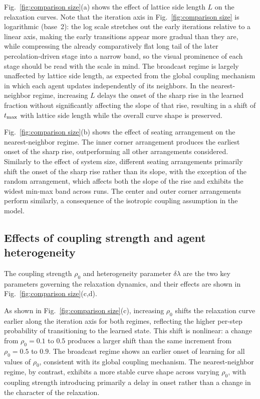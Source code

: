 \documentclass[a4paper,fleqn]{cas-sc}
\begin{document}
  Fig.~\ref{fig:comparison size}(a) shows the effect of lattice side length $L$ on the relaxation curves.
  Note that the iteration axis in Fig.~\ref{fig:comparison size} is logarithmic (base~2): the log scale stretches out the early iterations relative to a linear axis, making the early transitions appear more gradual than they are, while compressing the already comparatively flat long tail of the later percolation-driven stage into a narrow band, so the visual prominence of each stage should be read with the scale in mind.
  The broadcast regime is largely unaffected by lattice side length, as expected from the global coupling mechanism in which each agent updates independently of its neighbors.
  In the nearest-neighbor regime, increasing $L$ delays the onset of the sharp rise in the learned fraction without significantly affecting the slope of that rise, resulting in a shift of $t_{\rm max}$ with lattice side length while the overall curve shape is preserved.

  Fig.~\ref{fig:comparison size}(b) shows the effect of seating arrangement on the nearest-neighbor regime.
  The inner corner arrangement produces the earliest onset of the sharp rise, outperforming all other arrangements considered.
  Similarly to the effect of system size, different seating arrangements primarily shift the onset of the sharp rise rather than its slope, with the exception of the random arrangement, which affects both the slope of the rise and exhibits the widest min-max band across runs.
  The center and outer corner arrangements perform similarly, a consequence of the isotropic coupling assumption in the model.

\subsection{Effects of coupling strength and agent heterogeneity}

    The coupling strength $\rho_0$ and heterogeneity parameter $\delta\lambda$ are the two key parameters governing the relaxation dynamics, and their effects are shown in Fig.~\ref{fig:comparison size}(c,d).

    As shown in Fig.~\ref{fig:comparison size}(c), increasing $\rho_0$ shifts the relaxation curve earlier along the iteration axis for both regimes, reflecting the higher per-step probability of transitioning to the learned state.
    This shift is nonlinear: a change from $\rho_0=0.1$ to $0.5$ produces a larger shift than the same increment from $\rho_0=0.5$ to $0.9$.
    The broadcast regime shows an earlier onset of learning for all values of $\rho_0$, consistent with its global coupling mechanism.
    The nearest-neighbor regime, by contrast, exhibits a more stable curve shape across varying $\rho_0$, with coupling strength introducing primarily a delay in onset rather than a change in the character of the relaxation.
\end{document}
